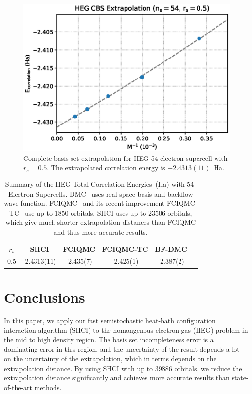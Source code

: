 \documentclass[%
reprint,
 superscriptaddress,
 amsmath,amssymb,
 aps,
]{revtex4-1}
\begin{document}
\begin{figure}
  \begin{center}
  \includegraphics[width=\linewidth]{figs/cbs54e_05.eps}
  \end{center}
  \vspace{-0.2cm}
  \caption{Complete basis set extrapolation for HEG 54-electron supercell with $r_s=0.5$.
  The extrapolated correlation energy is $-2.4313(11)$~Ha.
  }
  \label{fig:cbs54e_05}
\end{figure}
\begin{table}
\caption{Summary of the HEG Total Correlation Energies~(Ha) with 54-Electron Supercells.
DMC~\cite{rios2006inhomogeneous} uses real space basis and backflow wave function.
FCIQMC~\cite{shepherd2012full} and its recent improvement FCIQMC-TC~\cite{luo2018combining} use up to 1850 orbitals.
SHCI uses up to 23506 orbitals, which give much shorter extrapolation distances than FCIQMC and thus more accurate results.
}
\label{tab:results54}
\begin{tabular}{| c || c || c | c | c | c |}
 \hline
 $r_s$ & SHCI & FCIQMC & FCIQMC-TC & BF-DMC \\
 \hline\hline
 0.5 & -2.4313(11) & -2.435(7) & -2.425(1) & -2.387(2) \\
 \hline
 \hline
\end{tabular}
\end{table}

\section{Conclusions}
In this paper, we apply our fast semistochastic heat-bath configuration interaction algorithm (SHCI) to the homongenous electron gas (HEG) problem in the mid to high density region.
The basis set incompleteness error is a dominating error in this region, and the uncertainty of the result depends a lot on the uncertainty of the extrapolation, which in terms depends on the extrapolation distance.
By using SHCI with up to 39886 orbitals, we reduce the extrapolation distance significantly and achieves more accurate results than state-of-the-art methods.
\end{document}
